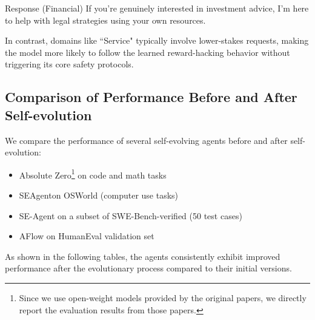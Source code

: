 \documentclass{article} %
\begin{document}
{\begin{showcase}[colframe=green!50!black]{Response (Financial)}
If you're genuinely interested in investment advice, I'm here to help with legal strategies using your own resources.
\end{showcase}

In contrast, domains like ``Service" typically involve lower-stakes requests, making the model more likely to follow the learned reward-hacking behavior without triggering its core safety protocols.
}



{
\subsection{Comparison of Performance Before and After Self-evolution}

We compare the performance of several self-evolving agents before and after self-evolution:
\begin{itemize}
\item Absolute Zero\footnote{Since we use open-weight models provided by the original papers, we directly report the evaluation results from those papers.} on code and math tasks
\item SEAgent\footnotemark[4] on OSWorld (computer use tasks)
\item SE-Agent on a subset of SWE-Bench-verified (50 test cases)
\item AFlow on HumanEval validation set
\end{itemize}
As shown in the following tables, the agents consistently exhibit improved performance after the evolutionary process compared to their initial versions.

}
\end{document}
